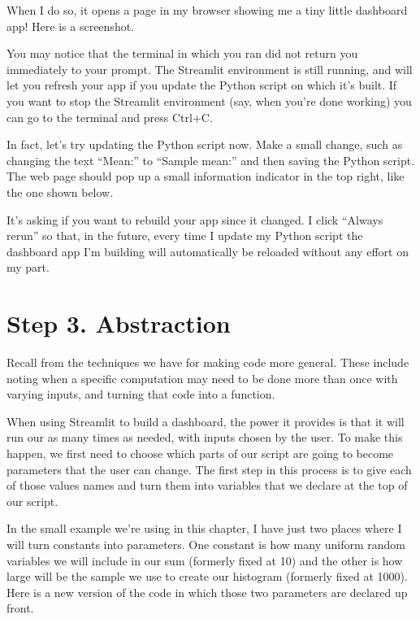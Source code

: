 \documentclass[letterpaper,10pt,english]{sphinxmanual}
\begin{document}
When I do so, it opens a page in my browser showing me a tiny little dashboard app!  Here is a screenshot.


You may notice that the terminal in which you ran  did not return you immediately to your prompt.  The Streamlit environment is still running, and will let you refresh your app if you update the Python script on which it’s built.  If you want to stop the Streamlit environment (say, when you’re done working) you can go to the terminal and press Ctrl+C.

In fact, let’s try updating the Python script now.  Make a small change, such as changing the text “Mean:” to “Sample mean:” and then saving the Python script.  The web page should pop up a small information indicator in the top right, like the one shown below.


It’s asking if you want to rebuild your app since it changed.  I click “Always rerun” so that, in the future, every time I update my Python script  the dashboard app I’m building will automatically be reloaded without any effort on my part.


\section{Step 3. Abstraction}
\label{\detokenize{chapter-14-dashboards:step-3-abstraction}}
Recall from {\hyperref[\detokenize{chapter-7-abstraction::doc}]{}} the techniques we have for making code more general.  These include noting when a specific computation may need to be done more than once with varying inputs, and turning that code into a function.

When using Streamlit to build a dashboard, the power it provides is that it will run our  as many times as needed, with inputs chosen by the user.  To make this happen, we first need to choose which parts of our script are going to become parameters that the user can change.  The first step in this process is to give each of those values names and turn them into variables that we declare at the top of our script.

In the small example we’re using in this chapter, I have just two places where I will turn constants into parameters.  One constant is how many uniform random variables we will include in our sum (formerly fixed at 10) and the other is how large will be the sample we use to create our histogram (formerly fixed at 1000).  Here is a new version of the code in which those two parameters are declared up front.
\end{document}
